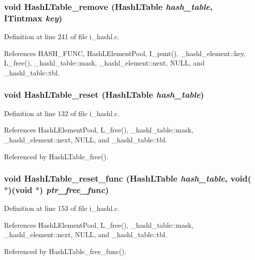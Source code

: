 \subsubsection{\setlength{\rightskip}{0pt plus 5cm}void Hash\-LTable\_\-remove (\bf{Hash\-LTable} {\em hash\_\-table}, \bf{ITintmax} {\em key})}\label{i__hashl_8c_a22d76051a8c344af928018cb1905877}




Definition at line 241 of file i\_\-hashl.c.

References HASH\_\-FUNC, Hash\-LElement\-Pool, I\_\-punt(), \_\-hashl\_\-element::key, L\_\-free(), \_\-hashl\_\-table::mask, \_\-hashl\_\-element::next, NULL, and \_\-hashl\_\-table::tbl.
\subsubsection{\setlength{\rightskip}{0pt plus 5cm}void Hash\-LTable\_\-reset (\bf{Hash\-LTable} {\em hash\_\-table})}\label{i__hashl_8c_aaa44d3f5471ec352c95a534f5a46ebc}




Definition at line 132 of file i\_\-hashl.c.

References Hash\-LElement\-Pool, L\_\-free(), \_\-hashl\_\-table::mask, \_\-hashl\_\-element::next, NULL, and \_\-hashl\_\-table::tbl.

Referenced by Hash\-LTable\_\-free().
\subsubsection{\setlength{\rightskip}{0pt plus 5cm}void Hash\-LTable\_\-reset\_\-func (\bf{Hash\-LTable} {\em hash\_\-table}, void($\ast$)(void $\ast$) {\em ptr\_\-free\_\-func})}\label{i__hashl_8c_7be7973671be7e3ae2e03faaca4fad72}




Definition at line 153 of file i\_\-hashl.c.

References Hash\-LElement\-Pool, L\_\-free(), \_\-hashl\_\-table::mask, \_\-hashl\_\-element::next, NULL, and \_\-hashl\_\-table::tbl.

Referenced by Hash\-LTable\_\-free\_\-func().

